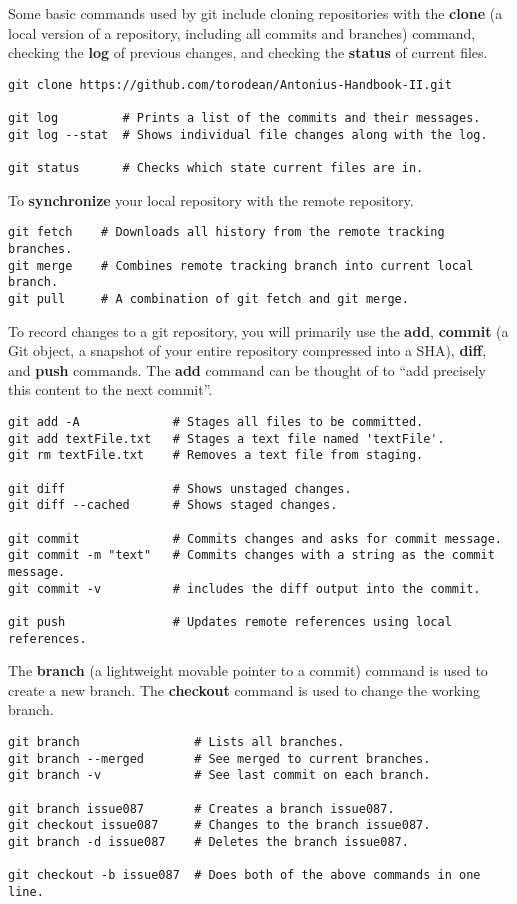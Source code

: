 Some basic commands used by git include cloning repositories with the \textbf{clone} (a local version of a repository, including all commits and branches) command, checking the \textbf{log} of previous changes, and checking the \textbf{status} of current files.
\begin{lstlisting}
git clone https://github.com/torodean/Antonius-Handbook-II.git

git log         # Prints a list of the commits and their messages.
git log --stat  # Shows individual file changes along with the log.

git status      # Checks which state current files are in.
\end{lstlisting}

To \textbf{synchronize} your local repository with the remote repository.
\begin{lstlisting}
git fetch    # Downloads all history from the remote tracking branches.
git merge    # Combines remote tracking branch into current local branch. 
git pull     # A combination of git fetch and git merge.
\end{lstlisting}

To record changes to a git repository, you will primarily use the \textbf{add}, \textbf{commit} (a Git object, a snapshot of your entire repository compressed into a SHA), \textbf{diff}, and \textbf{push} commands. The \textbf{add} command can be thought of to ``add precisely this content to the next commit''. 
\begin{lstlisting}
git add -A             # Stages all files to be committed.
git add textFile.txt   # Stages a text file named 'textFile'.
git rm textFile.txt    # Removes a text file from staging.

git diff               # Shows unstaged changes.
git diff --cached      # Shows staged changes.

git commit             # Commits changes and asks for commit message.
git commit -m "text"   # Commits changes with a string as the commit message.
git commit -v          # includes the diff output into the commit.

git push               # Updates remote references using local references.
\end{lstlisting}




The \textbf{branch} (a lightweight movable pointer to a commit) command is used to create a new branch. The \textbf{checkout} command is used to change the working branch.
\begin{lstlisting}
git branch                # Lists all branches.
git branch --merged       # See merged to current branches.
git branch -v             # See last commit on each branch.

git branch issue087       # Creates a branch issue087.
git checkout issue087     # Changes to the branch issue087.
git branch -d issue087    # Deletes the branch issue087.

git checkout -b issue087  # Does both of the above commands in one line.
\end{lstlisting}

